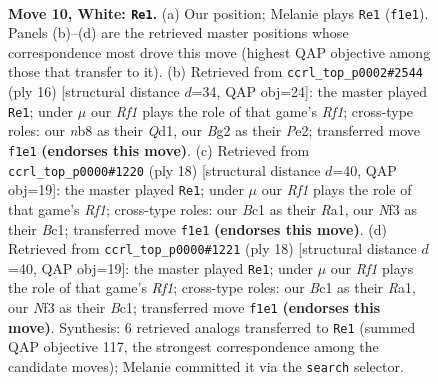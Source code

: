 \documentclass[11pt]{article}
\begin{document}
\clearpage

\begin{figure}[p]\centering
\begin{subfigure}{0.46\textwidth}\centering
\resizebox{\linewidth}{!}{%
\newchessgame
\chessboard[
  setfen={rnbqr1k1/pp4pp/2pbpn2/5p2/2PP4/2N2NP1/P3PPBP/R1BQ1RK1 w - - 3 10},
  showmover=false,
  pgfstyle=straightmove, color=movearrow, markmove={f1-e1}
]}
\caption{}
\end{subfigure}\hfill
\begin{subfigure}{0.46\textwidth}\centering
\resizebox{\linewidth}{!}{%
\newchessgame
\chessboard[
  setfen={rnbqr1k1/pp3ppp/2pb1n2/3p4/3P4/2N2NP1/PP2PPBP/R1BQ1RK1 w - - 6 9},
  showmover=false,
  pgfstyle=straightmove, color=movearrow, markmove={f1-e1}
]}
\caption{}
\end{subfigure}
\\[4pt]
\begin{subfigure}{0.46\textwidth}\centering
\resizebox{\linewidth}{!}{%
\newchessgame
\chessboard[
  setfen={rnbqr1k1/pp3pbp/3p1np1/2pP4/8/2N2NP1/PP2PPBP/R1BQ1RK1 w - - 6 10},
  showmover=false,
  pgfstyle=straightmove, color=movearrow, markmove={f1-e1}
]}
\caption{}
\end{subfigure}\hfill
\begin{subfigure}{0.46\textwidth}\centering
\resizebox{\linewidth}{!}{%
\newchessgame
\chessboard[
  setfen={rnbqr1k1/pp3pbp/3p1np1/2pP4/8/2N2NP1/PP2PPBP/R1BQ1RK1 w - - 6 10},
  showmover=false,
  pgfstyle=straightmove, color=movearrow, markmove={f1-e1}
]}
\caption{}
\end{subfigure}
\caption{\textbf{Move 10, White: \texttt{Re1}.} (a) Our position; Melanie plays \texttt{Re1} (\texttt{f1e1}). Panels (b)--(d) are the retrieved master positions whose correspondence most drove this move (highest QAP objective among those that transfer to it). (b) Retrieved from \texttt{ccrl\_top\_p0002\#2544} (ply 16) [structural distance $d$=34, QAP obj=24]: the master played \texttt{Re1}; under $\mu$ our \emph{Rf1} plays the role of that game's \emph{Rf1}; cross-type roles: our \emph{n}b8 as their \emph{Q}d1, our \emph{B}g2 as their \emph{P}e2; transferred move \texttt{f1e1} \textbf{(endorses this move)}. (c) Retrieved from \texttt{ccrl\_top\_p0000\#1220} (ply 18) [structural distance $d$=40, QAP obj=19]: the master played \texttt{Re1}; under $\mu$ our \emph{Rf1} plays the role of that game's \emph{Rf1}; cross-type roles: our \emph{B}c1 as their \emph{R}a1, our \emph{N}f3 as their \emph{B}c1; transferred move \texttt{f1e1} \textbf{(endorses this move)}. (d) Retrieved from \texttt{ccrl\_top\_p0000\#1221} (ply 18) [structural distance $d$=40, QAP obj=19]: the master played \texttt{Re1}; under $\mu$ our \emph{Rf1} plays the role of that game's \emph{Rf1}; cross-type roles: our \emph{B}c1 as their \emph{R}a1, our \emph{N}f3 as their \emph{B}c1; transferred move \texttt{f1e1} \textbf{(endorses this move)}. Synthesis: 6 retrieved analogs transferred to \texttt{Re1} (summed QAP objective 117, the strongest correspondence among the candidate moves); Melanie committed it via the \texttt{search} selector.}
\label{fig:thought-m18}
\end{figure}
\end{document}

